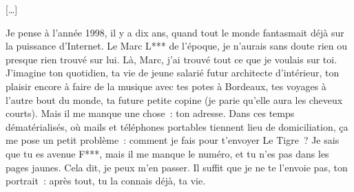 […]

Je pense à l'année 1998, il y a dix ans, quand tout le monde fantasmait déjà sur la puissance d'Internet. Le Marc L*** de l'époque, je n'aurais sans doute rien ou presque rien trouvé sur lui. Là, Marc, j'ai trouvé tout ce que je voulais sur toi. J'imagine ton quotidien, ta vie de jeune salarié futur architecte d'intérieur, ton plaisir encore à faire de la musique avec tes potes à Bordeaux, tes voyages à l'autre bout du monde, ta future petite copine (je parie qu'elle aura les cheveux courts). Mais il me manque une chose : ton adresse. Dans ces temps dématérialisés, où mails et téléphones portables tiennent lieu de domiciliation, ça me pose un petit problème : comment je fais pour t'envoyer Le Tigre ? Je sais que tu es avenue F***, mais il me manque le numéro, et tu n'es pas dans les pages jaunes. Cela dit, je peux m'en passer. Il suffit que je ne te l'envoie pas, ton portrait : après tout, tu la connais déjà, ta vie.
